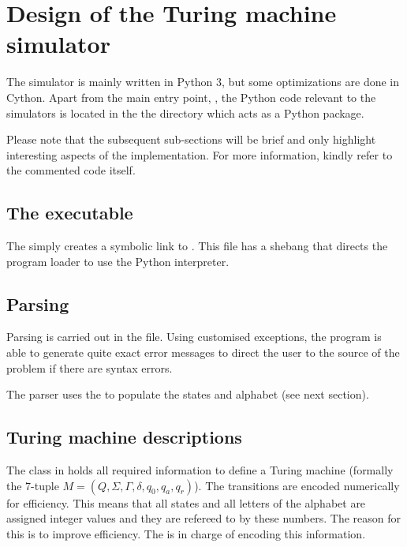 \section{Design of the Turing machine simulator}

The simulator is mainly written in Python 3, but some optimizations are done in Cython. Apart from the main entry point, , the Python code relevant to the simulators is located in the the  directory which acts as a Python package.

Please note that the subsequent sub-sections will be brief and only highlight interesting aspects of the implementation. For more information, kindly refer to the commented code itself.

\subsection{The  executable}

The  simply creates a symbolic link to . This file has a shebang that directs the program loader to use the Python interpreter.

\subsection{Parsing}

Parsing is carried out in the  file. Using customised exceptions, the program is able to generate quite exact error messages to direct the user to the source of the problem if there are syntax errors.

The parser uses the  to populate the states and alphabet (see next section). 

\subsection{Turing machine descriptions}

The  class in  holds all required information to define a Turing machine (formally the 7-tuple $M = (Q, \Sigma, \Gamma, \delta, q_0, q_a, q_r)$). The transitions are encoded numerically for efficiency. This means that all states and all letters of the alphabet are assigned integer values and they are refereed to by these numbers. The reason for this is to improve efficiency. The  is in charge of encoding this information.

